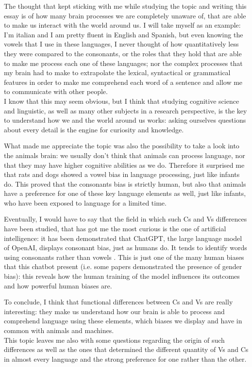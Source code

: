 The thought that kept sticking with me while studying the topic and writing this essay is of how many brain processes we are completely unaware of, that are able to make us interact with the world around us. I will take myself as an example: I'm italian and I am pretty fluent in English and Spanish, but even knowing the vowels that I use in these languages, I never thought of how quantitatively less they were compared to the consonants, or the roles that they hold that are able to make me process each one of these languages; nor the complex processes that my brain had to make to extrapolate the lexical, syntactical or grammatical features in order to make me comprehend each word of a sentence and allow me to communicate with other people. \\
I know that this may seem obvious, but I think that studying cognitive science and linguistic, as well as many other subjects in a research perspective, is the key to understand how we and the world around us works: asking ourselves questions about every detail is the engine for curiosity and knowledge. 

What made me appreciate the topic was also the possibility to take a look into the animals brain: we usually don't think that animals can process language, nor that they may have higher cognitive abilities as we do. Therefore it surprised me that rats and dogs showed a vowel bias in language processing, just like infants do. This proved that the consonants bias is strictly human, but also that animals have a preference for one of these key language elements as well, just like infants, who have been exposed to language for a limited time. 

Eventually, I would have to say that the field in which such Cs and Vs differences have been studied, that has got me the most curious is the one of artificial intelligence: it has been demonstrated that ChatGPT, the large language model of OpenAI, displays consonant bias, just as humans do. It tends to identify words using consonants rather than vowels \parencite{Toro_2023}. 
This is just one of the many human biases that this chatbot present (i.e. some papers demonstrated the presence of gender bias): this reveals how the human training of the model influences its outcomes and how powerful human biases are. 

To conclude, I think that functional differences between Cs and Vs are really interesting: they make us understand how our brain is able to process and comprehend language using these elements, which biases we display and have in common with animals and machines. \\
This topic leaves me also with some questions regarding the origin of such differences as well as the ones that determined the different quantity of Vs and Cs in almost every language and the strong preference for one rather than the other. 